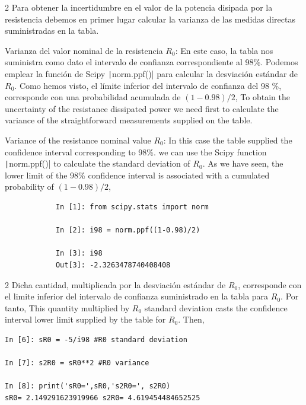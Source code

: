 \begin{paracol}{2}
Para obtener la incertidumbre en el valor de la potencia disipada por la resistencia debemos en primer lugar calcular la varianza de las medidas directas suministradas en la tabla.
 
\textbullet Varianza del valor nominal de la resistencia $R_0$: En este caso, la tabla nos suministra como dato el intervalo de confianza correspondiente al 98\%.  Podemos emplear la función de Scipy \texttt|norm.ppf()| para calcular la desviación estándar de $R_0$. Como hemos visto, el límite inferior del intervalo de confianza del 98 \%, corresponde con una probabilidad acumulada de $(1-0.98)/2$,
\switchcolumn
To obtain the uncertainty of the resistance dissipated power we need first to calculate the variance of the straightforward measurements supplied on the table.

\textbullet Variance of the resistance nominal value $R_0$: In this case the table supplied the confidence interval corresponding to 98\%. we can use the Scipy function \texttt|norm.ppf()| to calculate the standard deviation of $R_0$. As we have seen, the lower limit of the 98\% confidence interval is associated with a cumulated probability of $(1-0.98)/2$,   
\end{paracol}

\begin{center}
	\begin{minipage}{\textwidth}
		\begin{verbatim}
			In [1]: from scipy.stats import norm 

			In [2]: i98 = norm.ppf((1-0.98)/2)

			In [3]: i98
			Out[3]: -2.3263478740408408
		\end{verbatim}
	\end{minipage}
\end{center}

\begin{paracol}{2}
Dicha cantidad, multiplicada por la desviación estándar de $R_0$, corresponde con el limite inferior del intervalo de confianza suministrado en la tabla  para $R_0$. Por tanto,
\switchcolumn
This quantity multiplied by $R_0$ standard deviation casts the confidence interval lower limit supplied by the table for $R_0$. Then,  
\end{paracol}
\begin{center}
	\begin{minipage}{0.5\textwidth}
		\begin{verbatim}
In [6]: sR0 = -5/i98 #R0 standard deviation 

In [7]: s2R0 = sR0**2 #R0 variance

In [8]: print('sR0=',sR0,'s2R0=', s2R0)
sR0= 2.149291623919966 s2R0= 4.619454484652525
		\end{verbatim}
	\end{minipage}
\end{center}


